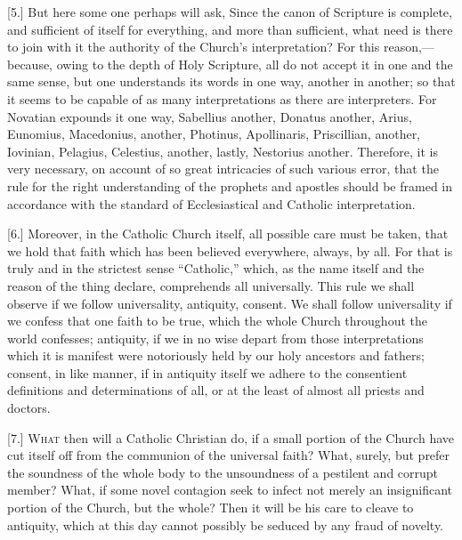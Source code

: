 [5.] But here some one perhaps will ask, Since the canon of Scripture is complete, and sufficient of itself for everything, and more than sufficient, what need is there to join with it the authority of the Church’s interpretation? For this reason,—because, owing to the depth of Holy Scripture, all do not accept it in one and the same sense, but one understands its words in one way, another in another; so that it seems to be capable of as many interpretations as there are interpreters. For Novatian expounds it one way, Sabellius another, Donatus another, Arius, Eunomius, Macedonius, another, Photinus, Apollinaris, Priscillian, another, Iovinian, Pelagius, Celestius, another, lastly, Nestorius another. Therefore, it is very necessary, on account of so great intricacies of such various error, that the rule for the right understanding of the prophets and apostles should be framed in accordance with the standard of Ecclesiastical and Catholic interpretation.

[6.] Moreover, in the Catholic Church itself, all possible care must be taken, that we hold that faith which has been believed everywhere, always, by all. For that is truly and in the strictest sense “Catholic,” which, as the name itself and the reason of the thing declare, comprehends all universally. This rule we shall observe if we follow universality, antiquity, consent. We shall follow universality if we confess that one faith to be true, which the whole Church throughout the world confesses; antiquity, if we in no wise depart from those interpretations which it is manifest were notoriously held by our holy ancestors and fathers; consent, in like manner, if in antiquity itself we adhere to the consentient definitions and determinations of all, or at the least of almost all priests and doctors.


[7.] \textsc{What} then will a Catholic Christian do, if a small portion of the Church have cut itself off from the communion of the universal faith? What, surely, but prefer the soundness of the whole body to the unsoundness of a pestilent and corrupt member? What, if some novel contagion seek to infect not merely an insignificant portion of the Church, but the whole? Then it will be his care to cleave to antiquity, which at this day cannot possibly be seduced by any fraud of novelty.

